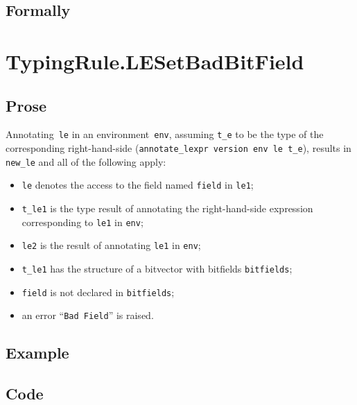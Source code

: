 \documentclass{book}
\begin{document}
\begin{emptyformal}
    \subsection{Formally}
\end{emptyformal}


\section{TypingRule.LESetBadBitField \label{sec:TypingRule.LESetBadBitField}}

    \subsection{Prose}
   Annotating~\texttt{le} in an environment~\texttt{env}, assuming
\texttt{t\_e} to be the type of the corresponding right-hand-side
(\texttt{annotate\_lexpr version env le t\_e}), results in \texttt{new\_le} and
all of the following apply:
   \begin{itemize}
   \item \texttt{le} denotes the access to the field named \texttt{field} in \texttt{le1};
   \item \texttt{t\_le1} is the type result of annotating the right-hand-side expression corresponding to \texttt{le1} in \texttt{env};
   \item \texttt{le2} is the result of annotating \texttt{le1} in \texttt{env};
   \item \texttt{t\_le1} has the structure of a bitvector with bitfields \texttt{bitfields};
   \item \texttt{field} is not declared in \texttt{bitfields};
   \item an error ``\texttt{Bad Field}'' is raised.
   \end{itemize}

  \subsection{Example}

  \subsection{Code}
\end{document}
